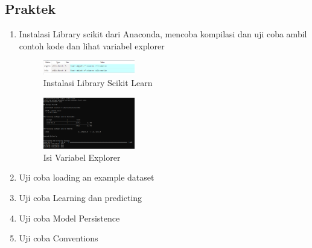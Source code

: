 \subsection{Praktek}
\begin{enumerate}
	\item Instalasi Library scikit dari Anaconda, mencoba kompilasi dan uji coba ambil contoh kode dan lihat variabel explorer
	\hfill\break
	\begin{figure}[H]
		\includegraphics[width=4cm]{figures/1174095/tugas1/materi/1.PNG}
		\centering
		\caption{Instalasi Library Scikit Learn}
	\end{figure}
	\begin{figure}[H]
		\includegraphics[width=4cm]{figures/1174095/tugas1/materi/2.png}
		\centering
		\caption{Isi Variabel Explorer}
	\end{figure}
	\item Uji coba loading an example dataset
	\hfill\break
	
	\item Uji coba Learning dan predicting
	\hfill\break
	
	\item Uji coba Model Persistence
	\hfill\break
	
	\item Uji coba Conventions
	\hfill\break
	
\end{enumerate}
